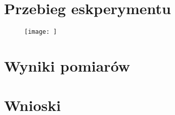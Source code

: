 \documentclass{article}
\begin{document}
\section{Przebieg eskperymentu}

\begin{figure}
    \texttt{[image: ]}
\end{figure}

\section{Wyniki pomiarów}

\section{Wnioski}
\end{document}
